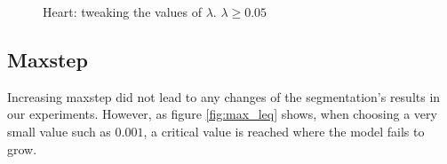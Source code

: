 \begin{figure}[!hbt]
\centering   
{}
\caption{Heart: tweaking the values of $ \lambda $. $\lambda \geq 0.05$}
\label{fig:lambda_geq}
\end{figure}

\subsection{Maxstep}

Increasing maxstep did not lead to any changes of the segmentation's results in our experiments. However, as figure \ref{fig:max_leq} shows, when choosing a very small value such as $0.001$, a critical value is reached where the model fails to grow.

